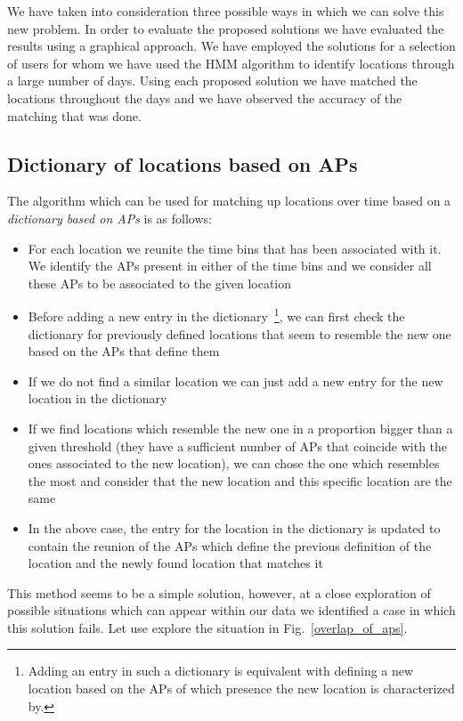 We have taken into consideration three possible ways in which we can solve this
new problem. In order to evaluate the proposed solutions we have evaluated the
results using a graphical approach. We have employed the solutions for a
selection of users for whom we have used the HMM algorithm to identify
locations through a large number of days. Using each proposed solution we have
matched the locations throughout the days and we have observed the accuracy of
the matching that was done.

\subsection{Dictionary of locations based on APs}
\label{dictionary_aps}
The algorithm which can be used for matching up locations over time based on a
\textit{dictionary based on APs} is as follows:
\begin{itemize}
  \item For each location we reunite the time bins that has been associated with
  it. We identify the APs present in either of the time bins and we consider
  all these APs to be associated to the given location
  \item Before adding a new entry in the dictionary~\footnote{Adding an entry
  in such a dictionary is equivalent with defining a new location based on the
  APs of which presence the new location is characterized by.}, we can first
  check the dictionary for previously defined locations that seem to resemble
  the new one based on the APs that define them
  \item If we do not find a similar location we can just add a new entry for the
  new location in the dictionary
  \item If we find locations which resemble the new one in a proportion bigger
  than a given threshold (they have a sufficient number of APs that coincide
  with the ones associated to the new location), we can chose the one which
  resembles the most and consider that the new location and this specific
  location are the same
  \item In the above case, the entry for the location in the dictionary is
  updated to contain the reunion of the APs which define the previous definition
  of the location and the newly found location that matches it
\end{itemize}

This method seems to be a simple solution, however, at a close exploration of
possible situations which can appear within our data we identified a case in
which this solution fails. Let use explore the situation in
Fig.~\ref{overlap_of_aps}. 

